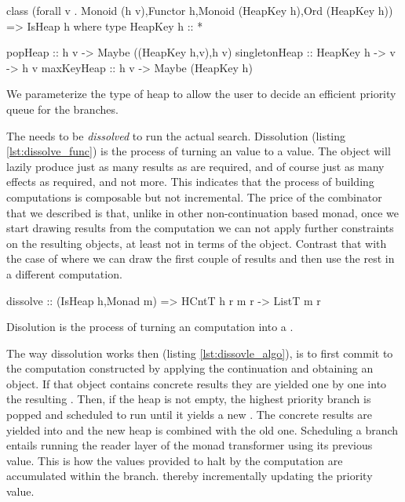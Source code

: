 \begin{code}
\begin{haskellcode}
class (forall v . Monoid (h v),Functor h,Monoid (HeapKey h),Ord (HeapKey h))
  => IsHeap h where
  type HeapKey h :: *

  popHeap :: h v -> Maybe ((HeapKey h,v),h v)
  singletonHeap :: HeapKey h -> v -> h v
  maxKeyHeap :: h v -> Maybe (HeapKey h)
\end{haskellcode}

  \caption{\label{lst:heap_def} We parameterize the type of heap to allow
    the user to decide an efficient priority queue for the branches.}
\end{code}

The  needs to be \emph{dissolved} to run the actual
search. Dissolution (listing \ref{lst:dissolve_func}) is the process
of turning an  value to a  value. The
 object will lazily produce just as many results as are
required, and of course just as many effects as required, and not
more. This indicates that the process of building computations is
composable but not incremental. The price of the \hask{<//>}
combinator that we described is that, unlike in other non-continuation
based monad, once we start drawing results from the computation we can
not apply further constraints on the resulting objects, at least not
in terms of the  object.  Contrast that with the case of
 where we can draw the first couple of results and then
use the rest in a different computation.

\begin{code}
\begin{haskellcode}
dissolve :: (IsHeap h,Monad m) => HCntT h r m r -> ListT m r
\end{haskellcode}
  \caption{\label{lst:dissolve_func}Disolution is the process of
    turning an  computation into a .}
\end{code}

The way dissolution works then (listing \ref{lst:dissovle_algo}), is to first
commit to the computation constructed by applying the continuation and
obtaining an  object. If that object contains concrete results they are
yielded one by one into the resulting .
Then, if the heap is not empty, the highest priority branch is popped and scheduled to run until it yields
a new . The concrete results are yielded into  and the
new heap is combined with the old one. Scheduling a branch entails
running the reader layer of the monad transformer using its previous
value. This is how the values provided to halt by the computation are accumulated within the branch.
thereby incrementally updating the priority value.

